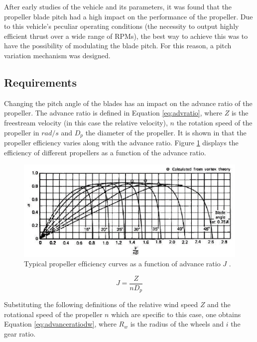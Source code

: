 After early studies of the vehicle and its parameters, it was found that the propeller blade pitch had a high impact on the performance of the propeller. Due to this vehicle’s peculiar operating conditions (the necessity to output highly efficient thrust over a wide range of RPMs), the best way to achieve this was to have the possibility of modulating the blade pitch. For this reason, a pitch variation mechanism was designed.

\subsection{Requirements}

Changing the pitch angle of the blades has an impact on the advance ratio of the propeller. The advance ratio is defined in Equation \ref{eq:advratio}, where $Z$ is the freestream velocity (in this case the relative velocity), $n$ the rotation speed of the propeller in $rad/s$ and $D_p$ the diameter of the propeller. It is shown in \cite{bronz2012multi} that the propeller efficiency varies along with the advance ratio. Figure \ref{fig:advratioeffi} displays the efficiency of different propellers as a function of the advance ratio.

\begin{figure}
    \centering
    \includegraphics{images/part7/advanceratioeffi.png}
    \caption{Typical propeller efﬁciency curves as a function of advance ratio $J$ \cite{bronz2012multi}.}
    \label{fig:advratioeffi}
\end{figure}

\begin{equation}
    J = \frac{Z}{n D_p}
    \label{eq:advratio}
\end{equation}

Substituting the following definitions of the relative wind speed $Z$ and the rotational speed of the propeller $n$ which are specific to this case, one obtains Equation \ref{eq:advanceratiodw}, where $R_w$ is the radius of the wheels and $i$ the gear ratio.

